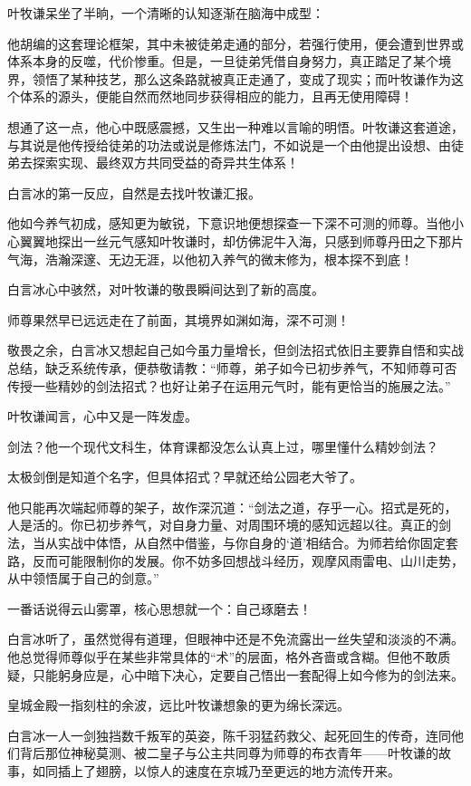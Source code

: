 叶牧谦呆坐了半晌，一个清晰的认知逐渐在脑海中成型：

他胡编的这套理论框架，其中未被徒弟走通的部分，若强行使用，便会遭到世界或体系本身的反噬，代价惨重。但是，一旦徒弟凭借自身努力，真正踏足了某个境界，领悟了某种技艺，那么这条路就被真正走通了，变成了现实；而叶牧谦作为这个体系的源头，便能自然而然地同步获得相应的能力，且再无使用障碍！

想通了这一点，他心中既感震撼，又生出一种难以言喻的明悟。叶牧谦这套道途，与其说是他传授给徒弟的功法或说是修炼法门，不如说是一个由他提出设想、由徒弟去探索实现、最终双方共同受益的奇异共生体系！

白言冰的第一反应，自然是去找叶牧谦汇报。

他如今养气初成，感知更为敏锐，下意识地便想探查一下深不可测的师尊。当他小心翼翼地探出一丝元气感知叶牧谦时，却仿佛泥牛入海，只感到师尊丹田之下那片气海，浩瀚深邃、无边无涯，以他初入养气的微末修为，根本探不到底！

白言冰心中骇然，对叶牧谦的敬畏瞬间达到了新的高度。

师尊果然早已远远走在了前面，其境界如渊如海，深不可测！

敬畏之余，白言冰又想起自己如今虽力量增长，但剑法招式依旧主要靠自悟和实战总结，缺乏系统传承，便恭敬请教：“师尊，弟子如今已初步养气，不知师尊可否传授一些精妙的剑法招式？也好让弟子在运用元气时，能有更恰当的施展之法。”

叶牧谦闻言，心中又是一阵发虚。

剑法？他一个现代文科生，体育课都没怎么认真上过，哪里懂什么精妙剑法？

太极剑倒是知道个名字，但具体招式？早就还给公园老大爷了。

他只能再次端起师尊的架子，故作深沉道：“剑法之道，存乎一心。招式是死的，人是活的。你已初步养气，对自身力量、对周围环境的感知远超以往。真正的剑法，当从实战中体悟，从自然中借鉴，与你自身的‘道’相结合。为师若给你固定套路，反而可能限制你的发展。你不妨多回想战斗经历，观摩风雨雷电、山川走势，从中领悟属于自己的剑意。”

一番话说得云山雾罩，核心思想就一个：自己琢磨去！

白言冰听了，虽然觉得有道理，但眼神中还是不免流露出一丝失望和淡淡的不满。他总觉得师尊似乎在某些非常具体的“术”的层面，格外吝啬或含糊。但他不敢质疑，只能躬身应是，心中暗下决心，定要自己悟出一套配得上如今修为的剑法来。

\vspace{2em}

皇城金殿一指刻柱的余波，远比叶牧谦想象的更为绵长深远。

白言冰一人一剑独挡数千叛军的英姿，陈千羽猛药救父、起死回生的传奇，连同他们背后那位神秘莫测、被二皇子与公主共同尊为师尊的布衣青年——叶牧谦的故事，如同插上了翅膀，以惊人的速度在京城乃至更远的地方流传开来。

